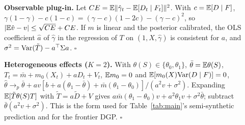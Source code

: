 \textbf{Observable plug-in.} Let $CE=\mathbb{E}\|\hat\gamma_t-\mathbb{E}[D_t\mid F_t]\|^2$. With $c=\mathbb{E}[D\mid F]$, $\gamma(1-\gamma)-c(1-c)=(\gamma-c)(1-2c)-(\gamma-c)^2$, so $|\mathbb{E}\hat v-v|\le\sqrt{CE}+CE$. If $m$ is linear and the posterior calibrated, the OLS coefficient $\hat a$ of $\hat\gamma$ in the regression of $T$ on $(1,X,\hat\gamma)$ is consistent for $a$, and $\sigma^2=\mathrm{Var}(\tilde T)-a^\top\Sigma a$. $\square$

\textbf{Heterogeneous effects ($K=2$).} With $\theta(S)\in\{\theta_0,\theta_1\}$, $\bar\theta=\mathbb{E}\theta(S)$, $T_t=\bar m+m_0(X_t)+aD_t+V_t$, $\mathbb{E} m_0=0$ and $\mathbb{E}[m_0(X)\mathrm{Var}(D\mid F)]=0$,
$\hat\theta\to_p\bar\theta+a v[b+a(\theta_1-\bar\theta)+\bar m(\theta_1-\theta_0)]/(a^2v+\sigma^2)$. Expanding $\mathbb{E}[\tilde T\theta(S)T]$ with $\tilde T=a\tilde D+V$ gives $a\bar m(\theta_1-\theta_0)v+a^2\theta_1v+\sigma^2\bar\theta$; subtract $\bar\theta(a^2v+\sigma^2)$. This is the form used for Table~\ref{tab:main}'s semi-synthetic prediction and for the frontier DGP. $\square$

